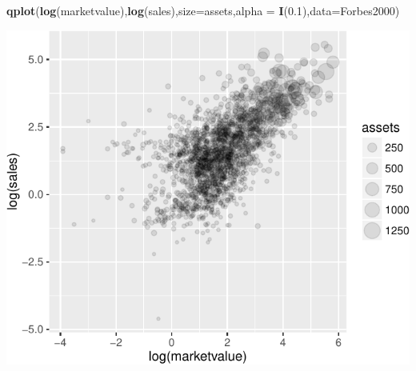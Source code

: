 \documentclass[]{article}
\newenvironment{Shaded}{\begin{snugshade}}{\end{snugshade}}
\newcommand{\KeywordTok}[1]{\textcolor[rgb]{0.13,0.29,0.53}{\textbf{{#1}}}}
\newcommand{\DataTypeTok}[1]{\textcolor[rgb]{0.13,0.29,0.53}{{#1}}}
\newcommand{\FloatTok}[1]{\textcolor[rgb]{0.00,0.00,0.81}{{#1}}}
\newcommand{\NormalTok}[1]{{#1}}
\numberwithin{equation}{section}
\begin{document}
\begin{Shaded}
\begin{Highlighting}[]
\KeywordTok{qplot}\NormalTok{(}\KeywordTok{log}\NormalTok{(marketvalue),}\KeywordTok{log}\NormalTok{(sales),}\DataTypeTok{size=}\NormalTok{assets,}\DataTypeTok{alpha =} \KeywordTok{I}\NormalTok{(}\FloatTok{0.1}\NormalTok{),}\DataTypeTok{data=}\NormalTok{Forbes2000)}
\end{Highlighting}
\end{Shaded}

\includegraphics{tema1_files/figure-latex/unnamed-chunk-152-4.pdf}
\end{document}
